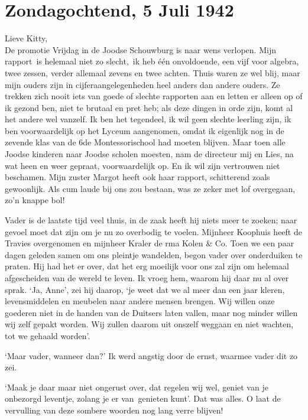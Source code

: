 \documentclass{book}
\begin{document}
\chapter{Zondagochtend, 5 Juli 1942}

Lieve Kitty,\\De promotie Vrijdag in de Joodse Schouwburg is naar wens
verlopen. Mijn rapport~is helemaal niet zo slecht,~ik heb één
onvoldoende, een vijf voor algebra, twee zessen, verder allemaal zevens
en twee achten. Thuis waren ze wel blij, maar mijn ouders zijn in
cijferaangelegenheden heel anders dan andere ouders. Ze trekken zich
nooit iets van goede of slechte rapporten aan en letten er alleen op of
ik gezond ben, niet te brutaal en pret heb; als deze dingen in orde
zijn, komt al het andere wel vanzelf. Ik ben het tegendeel, ik wil geen
slechte leerling zijn, ik ben voorwaardelijk op het Lyceum aangenomen,
omdat ik eigenlijk nog in de zevende klas van de 6de Montessorischool
had moeten blijven. Maar toen alle Joodse kinderen naar Joodse scholen
moesten, nam de directeur mij en Lies, na wat heen en weer gepraat,
voorwaardelijk op. En ik wil zijn vertrouwen niet beschamen. Mijn zuster
Margot heeft ook haar rapport, schitterend zoals gewoonlijk. Als cum
laude bij ons zou bestaan, was ze zeker met lof overgegaan, zo'n knappe
bol!

Vader is de laatste tijd veel thuis, in de zaak heeft hij niets meer te
zoeken; naar gevoel moet dat zijn om je nu zo overbodig te voelen.
Mijnheer Koophuis heeft de Travies overgenomen en mijnheer Kraler de rma
Kolen \& Co. Toen we een paar dagen geleden samen om ons pleintje
wandelden, begon vader over onderduiken te praten. Hij had het er over,
dat het erg moeilijk voor ons zal zijn om helemaal afgescheiden van de
wereld te leven. Ik vroeg hem, waarom hij daar nu al over sprak. `Ja,
Anne', zei hij daarop, `je weet dat we al meer dan een jaar kleren,
levensmiddelen en meubelen naar andere mensen brengen. Wij willen onze
goederen niet in de handen van de Duitsers laten vallen, maar nog minder
willen wij zelf gepakt worden. Wij zullen daarom uit onszelf weggaan en
niet wachten, tot we gehaald worden'.

`Maar vader, wanneer dan?' Ik werd angstig door de ernst, waarmee vader
dit zo zei.

`Maak je daar maar niet ongerust over, dat regelen wij wel, geniet van
je onbezorgd leventje, zolang je er van~genieten kunt'. Dat was alles. O
laat de vervulling van deze sombere woorden nog lang verre blijven!
\end{document}

